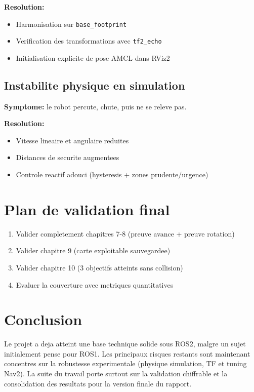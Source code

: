 \documentclass[11pt,a4paper,french]{imta}
\begin{document}
\textbf{Resolution:}
\begin{itemize}
  \item Harmonisation sur \texttt{base\_footprint}
  \item Verification des transformations avec \texttt{tf2\_echo}
  \item Initialisation explicite de pose AMCL dans RViz2
\end{itemize}

\subsection{Instabilite physique en simulation}
\textbf{Symptome:} le robot percute, chute, puis ne se releve pas.

\textbf{Resolution:}
\begin{itemize}
  \item Vitesse lineaire et angulaire reduites
  \item Distances de securite augmentees
  \item Controle reactif adouci (hysteresis + zones prudente/urgence)
\end{itemize}

\section{Plan de validation final}
\begin{enumerate}
  \item Valider completement chapitres 7-8 (preuve avance + preuve rotation)
  \item Valider chapitre 9 (carte exploitable sauvegardee)
  \item Valider chapitre 10 (3 objectifs atteints sans collision)
  \item Evaluer la couverture avec metriques quantitatives
\end{enumerate}

\section{Conclusion}
Le projet a deja atteint une base technique solide sous ROS2, malgre un sujet initialement pense pour ROS1. Les principaux risques restants sont maintenant concentres sur la robustesse experimentale (physique simulation, TF et tuning Nav2). La suite du travail porte surtout sur la validation chiffrable et la consolidation des resultats pour la version finale du rapport.
\end{document}
